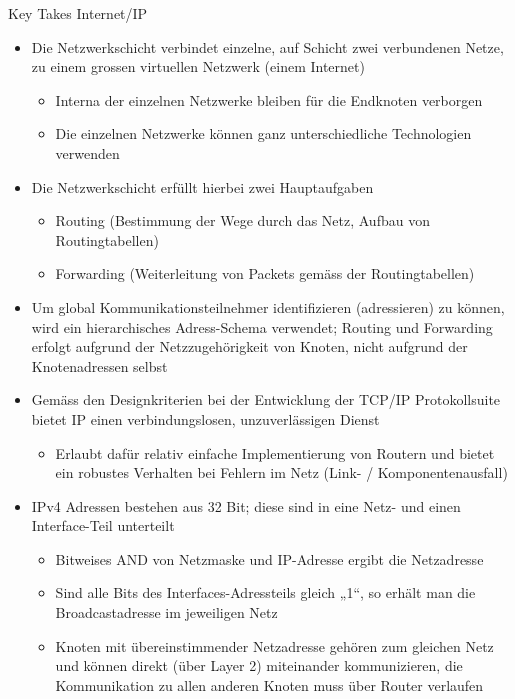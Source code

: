 \begin{KR}{Key Takes Internet/IP}
    \begin{itemize}
        \item Die Netzwerkschicht verbindet einzelne, auf Schicht zwei verbundenen Netze, zu einem grossen virtuellen Netzwerk (einem Internet)
        \begin{itemize}
            \item Interna der einzelnen Netzwerke bleiben für die Endknoten verborgen
            \item Die einzelnen Netzwerke können ganz unterschiedliche Technologien verwenden
        \end{itemize}
        \item Die Netzwerkschicht erfüllt hierbei zwei Hauptaufgaben
        \begin{itemize}
            \item Routing (Bestimmung der Wege durch das Netz, Aufbau von Routingtabellen)
            \item Forwarding (Weiterleitung von Packets gemäss der Routingtabellen)
        \end{itemize}
        \item Um global Kommunikationsteilnehmer identifizieren (adressieren) zu können, wird ein hierarchisches Adress-Schema verwendet; Routing und Forwarding erfolgt aufgrund der Netzzugehörigkeit von Knoten, nicht aufgrund der Knotenadressen selbst
        \item Gemäss den Designkriterien bei der Entwicklung der TCP/IP Protokollsuite bietet IP einen verbindungslosen, unzuverlässigen Dienst
        \begin{itemize}
            \item Erlaubt dafür relativ einfache Implementierung von Routern und bietet ein robustes Verhalten bei Fehlern im Netz (Link- / Komponentenausfall)
        \end{itemize}
        \item IPv4 Adressen bestehen aus 32 Bit; diese sind in eine Netz- und einen Interface-Teil unterteilt
        \begin{itemize}
            \item Bitweises AND von Netzmaske und IP-Adresse ergibt die Netzadresse
            \item Sind alle Bits des Interfaces-Adressteils gleich „1“, so erhält man die Broadcastadresse im jeweiligen Netz
            \item Knoten mit übereinstimmender Netzadresse gehören zum gleichen Netz und können direkt (über Layer 2) miteinander kommunizieren, die Kommunikation zu allen anderen Knoten muss über Router verlaufen

\end{itemize}
\end{itemize}
\end{KR}
